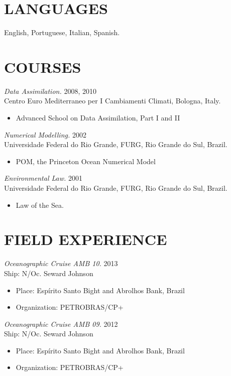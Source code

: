 \documentclass[line,margin]{res}
\begin{document}
\begin{resume}
\section{LANGUAGES}
English, Portuguese, Italian, Spanish.

\section{COURSES}
{\sl Data Assimilation.} \hfill 2008, 2010\\
Centro Euro Mediterraneo per I Cambiamenti Climati, Bologna, Italy.
\begin{itemize}  \itemsep -2pt
\item Advanced School on Data Assimilation, Part I and II
\end{itemize}

{\sl Numerical Modelling.} \hfill 2002\\
Universidade Federal do Rio Grande, FURG, Rio Grande do Sul, Brazil.
\begin{itemize}  \itemsep -2pt
\item POM, the Princeton Ocean Numerical Model
\end{itemize}

{\sl Environmental Law.} \hfill 2001\\
Universidade Federal do Rio Grande, FURG, Rio Grande do Sul, Brazil.
\begin{itemize}  \itemsep -2pt
\item Law of the Sea.
\end{itemize}

\section{FIELD EXPERIENCE}  %
{\sl Oceanographic Cruise AMB 10.} \hfill 2013\\
Ship: N/Oc. Seward Johnson
\begin{itemize}  \itemsep -2pt
  \item Place: Espírito Santo Bight and Abrolhos Bank, Brazil
  \item Organization: PETROBRAS/CP+
\end{itemize}

{\sl Oceanographic Cruise AMB 09.} \hfill 2012\\
Ship: N/Oc. Seward Johnson
\begin{itemize}  \itemsep -2pt
  \item Place: Espírito Santo Bight and Abrolhos Bank, Brazil
  \item Organization: PETROBRAS/CP+
\end{itemize}



\end{resume}
\end{document}
